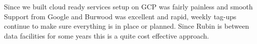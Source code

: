 Since we built cloud ready services setup on GCP was fairly painless and smooth
Support from Google and Burwood was excellent and rapid, weekly tag-ups continue to make sure everything is in place or planned.
Since Rubin is between data facilities for some years this is a quite cost effective approach.





